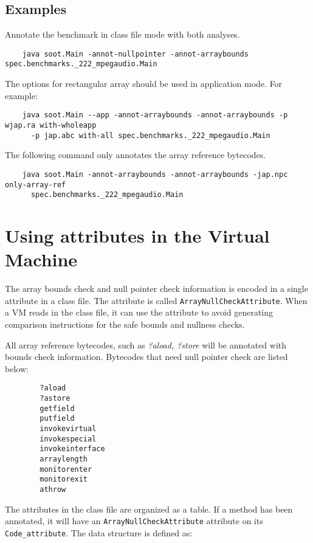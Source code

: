 \documentclass{article}
\begin{document}
\subsection{Examples}

Annotate the benchmark in class file mode with both analyses.
\begin{verbatim}
    java soot.Main -annot-nullpointer -annot-arraybounds spec.benchmarks._222_mpegaudio.Main
\end{verbatim}

The options for rectangular array should be used in application 
mode. For example:
\begin{verbatim}
    java soot.Main --app -annot-arraybounds -annot-arraybounds -p wjap.ra with-wholeapp 
      -p jap.abc with-all spec.benchmarks._222_mpegaudio.Main
\end{verbatim}

The following command only annotates the array reference bytecodes.
\begin{verbatim}
    java soot.Main -annot-arraybounds -annot-arraybounds -jap.npc only-array-ref 
      spec.benchmarks._222_mpegaudio.Main
\end{verbatim}


\section{Using attributes in the Virtual Machine}
The array bounds check and null pointer check information is encoded 
in a single attribute in a class file. The attribute is called 
{\tt ArrayNullCheckAttribute}. When a VM reads in the class file, 
it can use the attribute to avoid generating comparison instructions for
the safe bounds and nullness checks. 

All array reference bytecodes, such as {\em ?aload, ?store} will be annotated 
with bounds check information. Bytecodes that need null pointer check 
are listed below:
\begin{verbatim}
        ?aload
        ?astore
        getfield
        putfield
        invokevirtual
        invokespecial
        invokeinterface
        arraylength
        monitorenter
        monitorexit
        athrow
\end{verbatim}

The attributes in the class file are organized as a table. If a method
has been annotated, it will have an {\tt ArrayNullCheckAttribute}
attribute on its {\tt Code\_attribute}. The data structure is defined as:
\end{document}
